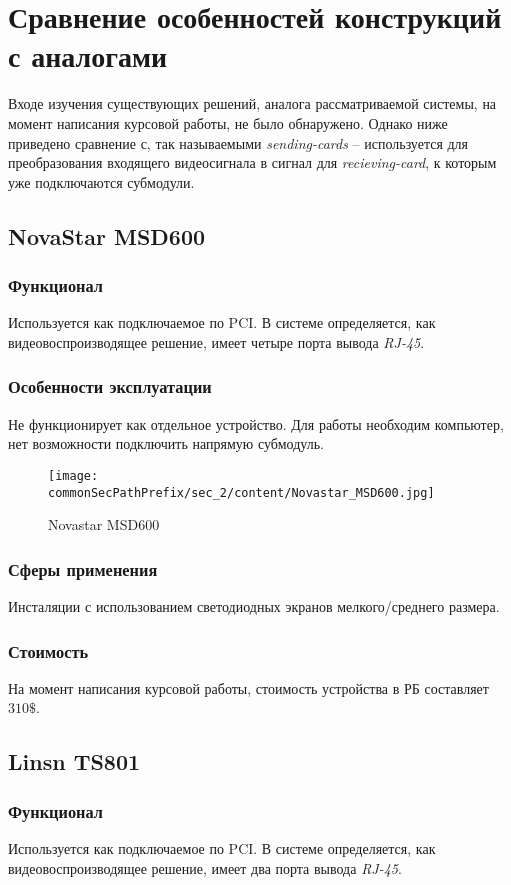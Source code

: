 \section{Сравнение особенностей конструкций с аналогами}
\label{sec:analogs}
Входе изучения существующих решений, аналога рассматриваемой системы, на момент написания курсовой работы, не было обнаружено. Однако ниже приведено сравнение с, так называемыми \textit{sending-cards} -- используется для преобразования входящего видеосигнала в сигнал для \textit{recieving-card}, к которым уже подключаются субмодули.

\subsection{NovaStar MSD600}
\subsubsection{Функционал}
Используется как подключаемое по PCI. В системе определяется, как видеовоспроизводящее решение, имеет четыре порта вывода \textit{RJ-45}. 
\subsubsection{Особенности эксплуатации}
Не функционирует как отдельное устройство. Для работы необходим компьютер, нет возможности подключить напрямую субмодуль.
\begin{figure}[ht]
    \centering
    \texttt{[image: \\commonSecPathPrefix/sec\_2/content/Novastar\_MSD600.jpg]}
    \caption{Novastar MSD600}
\end{figure}
\subsubsection{Сферы применения}
Инсталяции с использованием светодиодных экранов мелкого/среднего размера.
\subsubsection{Стоимость}
На момент написания курсовой работы, стоимость устройства в РБ составляет \(310\$\).

\subsection{Linsn TS801}
\subsubsection{Функционал}
Используется как подключаемое по PCI. В системе определяется, как видеовоспроизводящее решение, имеет два порта вывода \textit{RJ-45}. 
